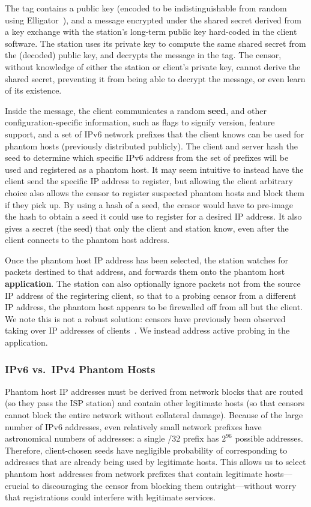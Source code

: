 \documentclass[letterpaper,twocolumn,10pt]{article}
\begin{document}
The tag contains a public key (encoded to be indistinguishable from random using
Elligator~\cite{elligator}), and a message encrypted under the shared secret
derived from a key exchange with the station's long-term public key hard-coded
in the client software. The station uses its private key to compute the same
shared secret from the (decoded) public key, and decrypts the message in the
tag. The censor, without knowledge of either the station or client's private
key, cannot derive the shared secret, preventing it from being able to decrypt
the message, or even learn of its existence.


Inside the message, the client communicates a random \textbf{seed}, and other
configuration-specific information, such as flags to signify version, feature
support, and a set of IPv6 network prefixes that the client knows can be used
for phantom hosts (previously distributed publicly).
The client and server hash the seed to determine which specific
IPv6 address from the set of prefixes will be used and registered as a phantom host. It may seem intuitive to instead have the client
send the specific IP address to register, but allowing the client arbitrary
choice also allows the censor to register suspected phantom hosts and block them if
they pick up. 
By using a hash of a seed, the censor would have to pre-image the hash to
obtain a seed it could use to register for a desired IP address.
It also gives a
secret (the seed) that only the client and station know, even after the client
connects to the phantom host address.

Once the phantom host IP address has been selected, the station watches for
packets destined to that address, and forwards them onto the phantom host
\textbf{application}. The station can also optionally ignore packets not from
the source IP address of the registering client, so that to a probing censor
from a different IP address,
the phantom host appears to be firewalled off from all but the client. We note
this is not a robust solution: censors have previously been observed taking over
IP addresses of clients~\cite{ensafi-tor}. We instead address active probing in
the application.

\subsubsection{IPv6 vs.\ IPv4 Phantom Hosts}


Phantom host IP addresses must be derived from network blocks that are routed (so they pass
the ISP station) and contain other legitimate hosts (so that censors cannot
block the entire network without collateral damage).
Because of the large number of IPv6 addresses, even
relatively small network prefixes have astronomical numbers of addresses: a
single /32 prefix has $2^{96}$ possible addresses. Therefore, client-chosen
seeds have negligible probability of corresponding to addresses that are already
being used by legitimate hosts. This allows us to select phantom host addresses
from network prefixes that contain
legitimate hosts---crucial to discouraging the censor from blocking them
outright---without worry that registrations could interfere with legitimate
services.
\end{document}
